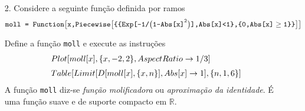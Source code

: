\documentclass[11pt]{article}
\begin{document}
\begin{itemize}
\begin{itemize}
\item[c)]  O problema $5n+1$ \'e uma variante do problema de Collatz em que se define uma fun\c{c}\~ao iteradora \texttt{S} por
 \[\begin{array}{l}
\texttt{S[n\textunderscore Integer?EvenQ/;Mod[n,2]==0]:=n/2;} \\ 
\texttt{S[n\_Integer/;(Mod[n,3]==0 \&\& Mod[n,2]!=0)]:=n/3;}\\
\texttt{S[n\_Integer?OddQ/;Mod[n,3]!=0]:=5n+1;}
\end{array}
 \]
Verifique que a  fun\c{c}\~ao  \texttt{S}  est\'a definida para todo o $n\in\mathbb{N}$. 

Segundo a conjetura $5n+1$, qualquer que seja o inteiro inicial \texttt{n}, se aplicarmos a fun\c{c}\~ao \texttt{S} um n\'umero suficiente de vezes chegaremos inevitavelmente ao n\'umero $1$ ap\'os um n\'umero finito de passos.  Teste a conjetura executando as instru\c{c}\~oes

 \[\begin{array}{l}
\texttt{data\,=\,MatrixForm[Table[NestList[S,n,niter],\{n,nmax\}]];}\\
\texttt{Style[data}\,\texttt{/.\{1\,->\,Style[1,Red,Bold]\},20] }
\end{array}
 \]
para diferentes valores de \texttt{niter} e \texttt{nmax}. Determine os ciclos, e  os respectivos per\'\i odos, da itera\c{c}\~ao.  
 Experimente ainda o comando
\[
\texttt{NestWhileList[S,n,Function[x,x!=1]]}
\]
escolhendo diferentes valores para $n$.

   \underline{Resposta:} \ Existe apenas um ciclo $\{6,3,1\}$ de per\'\i odo $3$. 


  \end{itemize}

  
   \item[2.]   Considere a seguinte  fun\c{c}\~ao definida por ramos
 \[
 \texttt{moll = Function\big[x,Piecewise\big[\{\{Exp[-1/\big(1-Abs[x]}^\texttt{2}\texttt{\big)],Abs[x]<1\},\{0,Abs[x]}\geq\texttt{1\}\}\big]\big]}
      \]
 
 \medskip
 
 \noindent  
 Define a fun\c{c}\~ao \texttt{moll} e execute as instru\c{c}\~oes
  \[\begin{array}{l}
  Plot[moll[x], \{x, -2, 2\}, AspectRatio \rightarrow 1/3]\vspace{2mm}\\ 
  Table[Limit[D[moll[x], \{x, n\}], Abs[x] \rightarrow 1], \{n, 1, 6\}]
  \end{array}
 \]
 A fun\c{c}\~ao \texttt{moll} diz-se \textsl{fun\c{c}\~ao molificadora}   ou \textsl{aproxima\c{c}\~ao da identidade}. \'E uma fun\c{c}\~ao suave  e de suporte compacto em $\mathbb{R}$. 


\end{itemize}
\end{document}
